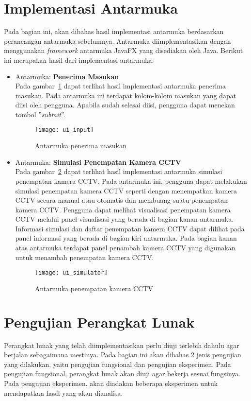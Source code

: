 \section{Implementasi Antarmuka}
Pada bagian ini, akan dibahas hasil implementasi antarmuka berdasarkan perancangan antarmuka sebelumnya. Antarmuka diimplementasikan dengan menggunakan \textit{framework} antarmuka JavaFX yang disediakan oleh Java. Berikut ini merupakan hasil dari implementasi antarmuka:
\begin{itemize}
	\item Antarmuka: \textbf{Penerima Masukan}\\
	Pada gambar~\ref{fig:ui_input} dapat terlihat hasil implementasi antarmuka penerima masukan. Pada antarmuka ini terdapat kolom-kolom masukan yang dapat diisi oleh pengguna. Apabila sudah selesai diisi, pengguna dapat menekan tombol ''\textit{submit}''.
	\begin{figure}[H]
		\centering  
		\texttt{[image: ui\_input]}
		\caption[Antarmuka penerima masukan]{Antarmuka penerima masukan}
		\label{fig:ui_input}
	\end{figure}
	
	\item Antarmuka: \textbf{Simulasi Penempatan Kamera CCTV}\\
	Pada gambar~\ref{fig:ui_simulator} dapat terlihat hasil implementasi antarmuka simulasi penempatan kamera CCTV. Pada antarmuka ini, pengguna dapat melakukan simulasi penempatan kamera CCTV seperti dengan menempatkan kamera CCTV secara manual atau otomatis dan membuang suatu penempatan kamera CCTV. Pengguna dapat melihat visualisasi penempatan kamera CCTV melalui panel visualisasi yang berada di bagian kanan antarmuka. Informasi simulasi dan daftar penempatan kamera CCTV dapat dilihat pada panel informasi yang berada di bagian kiri antarmuka. Pada bagian kanan atas antarmuka terdapat panel penambah kamera CCTV yang digunakan untuk menambah penempatan kamera CCTV.
	\begin{figure}[H]
		\centering  
		\texttt{[image: ui\_simulator]}
		\caption[Antarmuka penempatan kamera CCTV]{Antarmuka penempatan kamera CCTV}
		\label{fig:ui_simulator}
	\end{figure}
\end{itemize}

\section{Pengujian Perangkat Lunak}
Perangkat lunak yang telah diimplementasikan perlu diuji terlebih dahulu agar berjalan sebagaimana mestinya. Pada bagian ini akan dibahas 2 jenis pengujian yang dilakukan, yaitu pengujian fungsional dan pengujian eksperimen. Pada pengujian fungsional, perangkat lunak akan diuji agar bekerja sesuai fungsinya. Pada pengujian eksperimen, akan diadakan beberapa eksperimen untuk mendapatkan hasil yang akan dianalisa.

